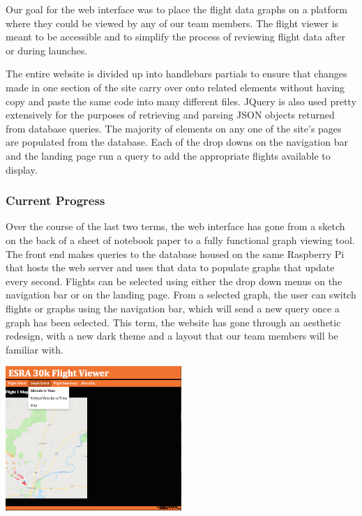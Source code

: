 \documentclass[onecolumn, draftclsnofoot, 10pt, compsoc]{IEEEtran}
\begin{document}
Our goal for the web interface was to place the flight data graphs on a platform where they could be viewed by any of our team members. 
The flight viewer is meant to be accessible and to simplify the process of reviewing flight data after or during launches.

The entire website is divided up into handlebars partials to ensure that changes made in one section of the site carry over onto related elements without having copy and paste the same code into many different files. 
JQuery is also used pretty extensively for the purposes of retrieving and parsing JSON objects returned from database queries. 
The majority of elements on any one of the site's pages are populated from the database. Each of the drop downs on the navigation bar and the landing page run a query to add the appropriate flights available to display.

\subsubsection{Current Progress}
Over the course of the last two terms, the web interface has gone from a sketch on the back of a sheet of notebook paper to a fully functional graph viewing tool. The front end makes queries to the database housed on the same Raspberry Pi that hosts the web server and uses that data to populate graphs that update every second. Flights can be selected using either the drop down menus on the navigation bar or on the landing page. From a selected graph, the user can switch flights or graphs using the navigation bar, which will send a new query once a graph has been selected. This term, the website has gone through an aesthetic redesign, with a new dark theme and a layout that our team members will be familiar with.

\begin{center}
	\includegraphics[width=0.5\textwidth]{images/smallMap.png}
    \label{gs-diagram}
\end{center}
       
\end{document}
